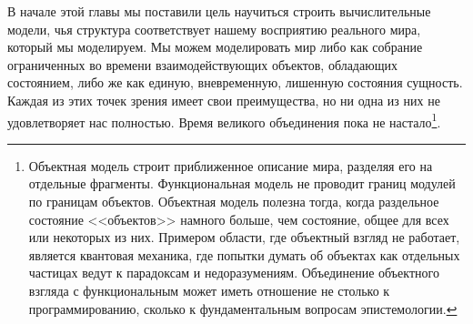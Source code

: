 В начале этой главы мы поставили цель научиться строить
вычислительные модели, чья структура соответствует нашему
восприятию реального мира, который мы моделируем.  Мы можем
моделировать мир либо как собрание ограниченных во времени
взаимодействующих объектов, обладающих состоянием, либо же
как единую, вневременную, лишенную состояния сущность.
Каждая из этих точек зрения имеет свои преимущества, но ни одна из них
не удовлетворяет нас полностью.  Время великого объединения пока не
\mbox{настало}\footnote{Объектная модель строит приближенное описание мира,
разделяя его на отдельные фрагменты.  Функциональная модель не проводит
 границ модулей по границам объектов.  Объектная модель полезна тогда,
когда раздельное состояние <<объектов>> намного больше, чем состояние,
общее для всех или некоторых из них.  Примером области, где объектный
взгляд не работает, является
квантовая механика, где попытки думать об объектах
как отдельных частицах ведут к парадоксам и недоразумениям.  Объединение
объектного взгляда с функциональным может иметь отношение не столько к
программированию, сколько к фундаментальным вопросам эпистемологии.
}.

%

